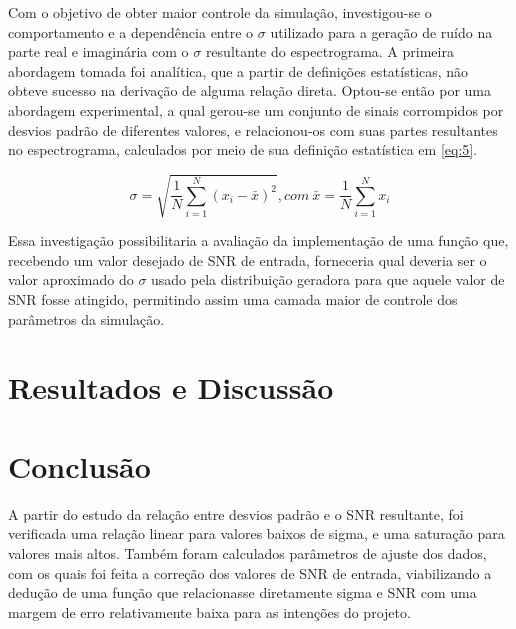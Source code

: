 \documentclass{article}
\begin{document}
Com o objetivo de obter maior controle da simulação, investigou-se o comportamento e a dependência entre o $\sigma$ utilizado para a geração de ruído na parte real e imaginária com o $\sigma$ resultante do espectrograma. A primeira abordagem 
tomada foi analítica, que a partir de definições estatísticas, não obteve sucesso na derivação de alguma relação direta. Optou-se então por uma abordagem experimental, a qual gerou-se um conjunto de sinais 
corrompidos por desvios padrão de diferentes valores, e relacionou-os com suas partes resultantes no espectrograma, calculados por meio de sua definição 
estatística em \ref{eq:5}.

\begin{equation} \label{eq:5}
    \sigma = \sqrt{\frac{1}{N} \sum_{i=1}^{N} (x_i - \bar{x})^2}, com \ \bar{x} = \frac{1}{N} \sum_{i = 1}^{N} x_i  
\end{equation}

Essa investigação possibilitaria a avaliação da implementação de uma função que, recebendo um valor desejado de SNR de entrada, forneceria qual deveria ser o valor aproximado do $\sigma$ usado pela distribuição 
geradora para que aquele valor de SNR fosse atingido, permitindo assim uma camada maior de controle dos parâmetros da simulação.



\section{Resultados e Discussão}

\section{Conclusão}

A partir do estudo da relação entre desvios padrão e o SNR resultante, 
foi verificada uma relação linear para valores baixos de sigma, e uma 
saturação para valores mais altos. Também foram calculados 
parâmetros de ajuste dos dados, com os quais foi feita a correção dos 
valores de SNR de entrada, viabilizando a dedução de uma função que 
relacionasse diretamente sigma e SNR com uma margem de erro 
relativamente baixa para as intenções do projeto.






\end{document}
